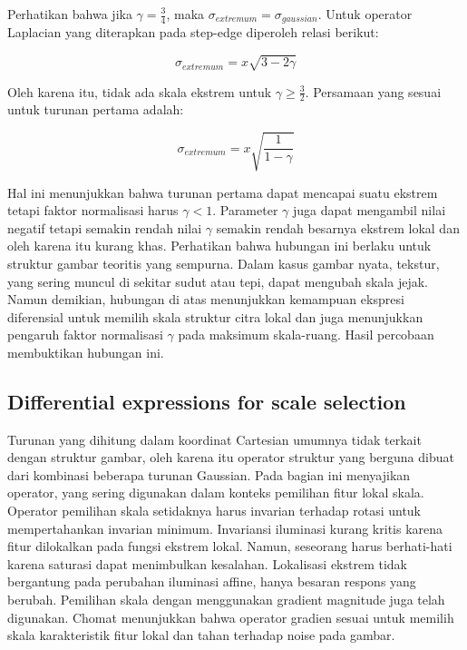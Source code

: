 Perhatikan bahwa jika \(\gamma = \frac{3}{4}\), maka \(\sigma_{extremum} = \sigma_{gaussian}\). Untuk operator Laplacian yang diterapkan pada step-edge diperoleh relasi berikut:

\begin{equation}
  \sigma_{extremum} = x\sqrt{3 - 2\gamma}
\end{equation}

Oleh karena itu, tidak ada skala ekstrem untuk \(\gamma \geq \frac{3}{2}\). Persamaan yang sesuai untuk turunan pertama adalah:

\begin{equation}
  \sigma_{extremum} = x\sqrt{\frac{1}{1-\gamma}}
\end{equation}

Hal ini menunjukkan bahwa turunan pertama dapat mencapai suatu ekstrem tetapi faktor normalisasi harus \(\gamma < 1\). Parameter \(\gamma\) juga dapat mengambil 
nilai negatif tetapi semakin rendah nilai \(\gamma\) semakin rendah besarnya ekstrem lokal dan oleh karena itu kurang khas. Perhatikan bahwa hubungan ini berlaku untuk struktur 
gambar teoritis yang sempurna. Dalam kasus gambar nyata, tekstur, yang sering muncul di sekitar sudut atau tepi, dapat mengubah skala jejak. Namun demikian, 
hubungan di atas menunjukkan kemampuan ekspresi diferensial untuk memilih skala struktur citra lokal dan juga menunjukkan pengaruh faktor normalisasi \(\gamma\) pada maksimum skala-ruang. 
Hasil percobaan membuktikan hubungan ini.

\subsection{\textbf{Differential expressions for scale selection}}
Turunan yang dihitung dalam koordinat Cartesian umumnya tidak terkait dengan struktur gambar, oleh karena itu operator struktur yang berguna dibuat dari kombinasi 
beberapa turunan Gaussian. Pada bagian ini menyajikan operator, yang sering digunakan dalam konteks pemilihan fitur lokal skala. Operator pemilihan skala setidaknya 
harus invarian terhadap rotasi untuk mempertahankan invarian minimum. Invariansi iluminasi kurang kritis karena fitur dilokalkan pada fungsi ekstrem lokal. 
Namun, seseorang harus berhati-hati karena saturasi dapat menimbulkan kesalahan. Lokalisasi ekstrem tidak bergantung pada perubahan iluminasi affine, hanya besaran respons yang berubah. 
Pemilihan skala dengan menggunakan gradient magnitude juga telah digunakan. Chomat menunjukkan bahwa operator gradien sesuai untuk memilih skala karakteristik fitur lokal dan tahan terhadap noise pada gambar.

